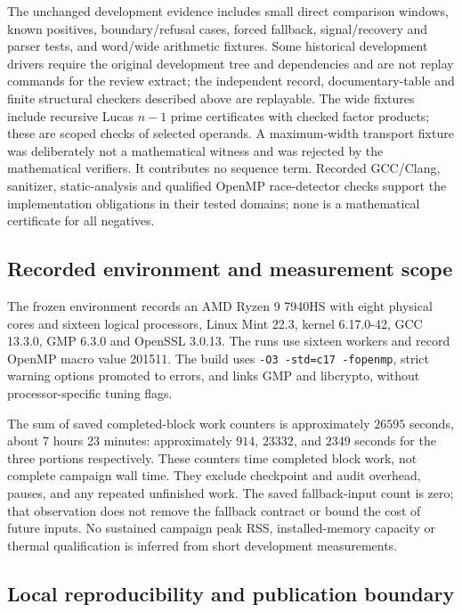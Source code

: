 \documentclass[11pt]{article}
\theoremstyle{definition}
\theoremstyle{remark}
\begin{document}
The unchanged development evidence includes small direct comparison
windows, known positives, boundary/refusal cases, forced fallback,
signal/recovery and parser tests, and word/wide arithmetic fixtures.
Some historical development drivers require the original development
tree and dependencies and are not replay commands for the review
extract; the independent record, documentary-table and finite
structural checkers described above are replayable.
The wide fixtures include recursive Lucas $n-1$ prime certificates
with checked factor products; these are scoped checks of selected
operands. A maximum-width transport fixture was deliberately not
a mathematical witness and was rejected by the mathematical
verifiers. It contributes no sequence term. Recorded GCC/Clang,
sanitizer, static-analysis and qualified OpenMP race-detector checks
support the implementation obligations in their tested domains;
none is a mathematical certificate for all negatives.

\subsection{Recorded environment and measurement scope}

The frozen environment records an AMD Ryzen 9 7940HS with eight
physical cores and sixteen logical processors, Linux Mint 22.3,
kernel 6.17.0-42, GCC 13.3.0, GMP 6.3.0 and OpenSSL 3.0.13.
The runs use sixteen workers and record OpenMP macro value 201511.
The build uses \texttt{-O3 -std=c17 -fopenmp}, strict warning
options promoted to errors, and links GMP and libcrypto, without
processor-specific tuning flags.

The sum of saved completed-block work counters is approximately
$26595$ seconds, about 7 hours 23 minutes: approximately $914$,
$23332$, and $2349$ seconds for the three portions respectively.
These counters time completed block work, not complete campaign
wall time. They exclude checkpoint and audit overhead, pauses,
and any repeated unfinished work. The saved fallback-input count
is zero; that observation does not remove the fallback contract
or bound the cost of future inputs. No sustained campaign peak
RSS, installed-memory capacity or thermal qualification is inferred
from short development measurements.

\subsection{Local reproducibility and publication boundary}
\end{document}
